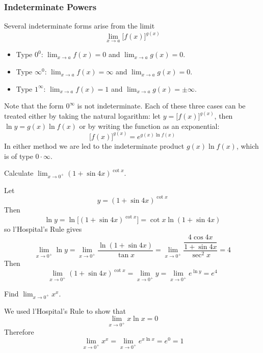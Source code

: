 \subsubsection*{Indeterminate Powers}
Several indeterminate forms arise from the limit
\[\lim_{x\to a}\big[f(x)\big]^{g(x)}\]
\begin{itemize}
    \item Type \(0^0\): \(\displaystyle{\lim_{x\to a}f(x)=0}\) and
    \(\displaystyle{\lim_{x\to a}g(x)=0}\).
    \item Type \(\infty^0\): \(\displaystyle{\lim_{x\to a}f(x)=\infty}\) and
    \(\displaystyle{\lim_{x\to a}g(x)=0}\).
    \item Type \(1^\infty\): \(\displaystyle{\lim_{x\to a}f(x)=1}\) and
    \(\displaystyle{\lim_{x\to a}g(x)=\pm\infty}\).
\end{itemize}
Note that the form \(0^\infty\) is not indeterminate.
Each of these three cases can be treated either by taking the natural
logarithm: let \(y=\big[f(x)\big]^{g(x)}\), then \(\ln y=g(x)\ln f(x)\) or
by writing the function as an exponential:
\[\big[f(x)\big]^{g(x)}=e^{g(x)\ln f(x)}\]
In either method we are led to the indeterminate product \(g(x)\ln f(x)\),
which is of type \(0\cdot\infty\).
\begin{problem}
    Calculate \(\displaystyle{\lim_{x\to 0^+}(1+\sin 4x)^{\cot x}}\).
\end{problem}
\begin{solution}
    Let
    \[y=(1+\sin 4x)^{\cot x}\]
    Then
    \[\ln y=\ln\big[(1+\sin 4x)^{\cot x}\big]=\cot x\ln(1+\sin 4x)\]
    so l'Hospital's Rule gives
    \[\lim_{x\to 0^+}\ln y=\lim_{x\to 0^+}\frac{\ln(1+\sin 4x)}{\tan x}
    =\lim_{x\to 0^+}\frac{\dfrac{4\cos 4x}{1+\sin 4x}}{\sec^2 x}=4\]
    Then
    \[\lim_{x\to 0^+}(1+\sin 4x)^{\cot x}=\lim_{x\to 0^+}y
    =\lim_{x\to 0^+}e^{\ln y}=e^4\]
\end{solution}
\begin{problem}
    Find \(\displaystyle{\lim_{x\to 0^+}x^x}\).
\end{problem}
\begin{solution}
    We used l'Hospital's Rule to show that
   \[\lim_{x\to 0^+}x\ln x=0\]
   Therefore
   \[\lim_{x\to 0^+}x^x=\lim_{x\to 0^+}e^{x\ln x}=e^0=1\]
\end{solution}
